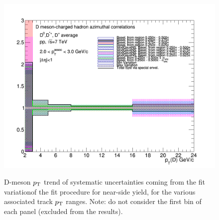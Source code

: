 \begin{figure}[!htbp]
{\includegraphics[width=0.48\linewidth, height=0.33\linewidth]{figures/FitOutput/BaselineSystematicSourcesNSYield_pthad2to3.png}}
\caption{D-meson $p_{\rm T}$ trend of systematic uncertainties coming from the fit variationof the fit procedure for near-side yield, for the various associated track $p_{\rm T}$ ranges. Note: do not consider the first bin of each panel (excluded from the results).}
\label{fig:NSyieldUnc}
\end{figure}

